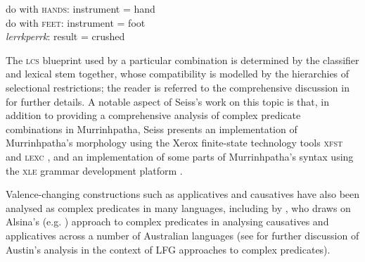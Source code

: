 \documentclass[output=paper,hidelinks]{langscibook}
\begin{document}
\ea\label{mp-lex}
do with \textsc{hands}: instrument = hand\\
do with \textsc{feet}: instrument = foot\\
{\it lerrkperrk}: result = crushed
\z

The \textsc{lcs} blueprint used by a particular combination is determined by the classifier and lexical stem together, whose compatibility is modelled by the hierarchies of selectional restrictions; the reader is referred to the comprehensive discussion in \citet{Seiss2013} for further details. A notable aspect of Seiss's work on this topic is that, in addition to providing a comprehensive analysis of complex predicate combinations in Murrinhpatha, Seiss presents an implementation of Murrinhpatha's morphology using the Xerox finite-state technology tools \textsc{xfst} and \textsc{lexc} \citep{beesleykarttunen03}, and an implementation of some parts of Murrinhpatha's syntax using the \textsc{xle} grammar development platform \citep{xledoc}.

Valence-changing constructions such as applicatives and causatives have also been analysed as complex predicates in many languages, including by \citet{Austin97}, who draws on Alsina's (e.g. \citeyear{Alsina1997}) approach to complex predicates in an\-a\-lys\-ing causatives and applicatives across a number of Australian languages (see  for further discussion of Austin's analysis in the context of LFG approaches to complex predicates).
\end{document}
